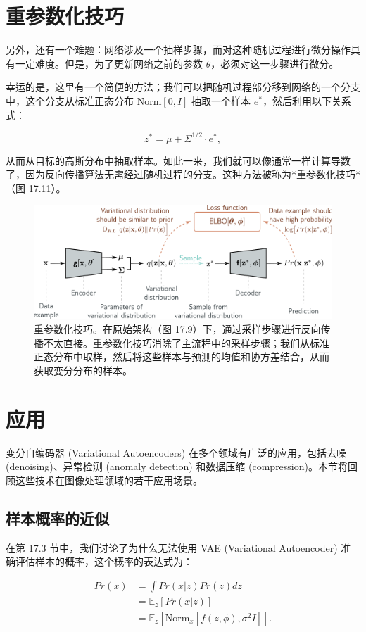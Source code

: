 \section{重参数化技巧}
另外，还有一个难题：网络涉及一个抽样步骤，而对这种随机过程进行微分操作具有一定难度。但是，为了更新网络之前的参数 \(\theta\)，必须对这一步骤进行微分。

幸运的是，这里有一个简便的方法；我们可以把随机过程部分移到网络的一个分支中，这个分支从标准正态分布 \(\text{Norm}[0, I]\) 抽取一个样本 \(e^*\)，然后利用以下关系式：

\begin{equation}
z^* = \mu + \Sigma^{1/2} \cdot e^*, 
\end{equation}

从而从目标的高斯分布中抽取样本。如此一来，我们就可以像通常一样计算导数了，因为反向传播算法无需经过随机过程的分支。这种方法被称为*重参数化技巧*（图 17.11）。

\begin{figure}[ht!]
\centering
\includegraphics[width=0.7\linewidth]{png/chapter17/VAEArch.png}
\caption{重参数化技巧。在原始架构（图 17.9）下，通过采样步骤进行反向传播不太直接。重参数化技巧消除了主流程中的采样步骤；我们从标准正态分布中取样，然后将这些样本与预测的均值和协方差结合，从而获取变分分布的样本。}
\end{figure}


\section{应用}
变分自编码器 (Variational Autoencoders) 在多个领域有广泛的应用，包括去噪 (denoising)、异常检测 (anomaly detection) 和数据压缩 (compression)。本节将回顾这些技术在图像处理领域的若干应用场景。

\subsection{样本概率的近似}
在第 17.3 节中，我们讨论了为什么无法使用 VAE (Variational Autoencoder) 准确评估样本的概率，这个概率的表达式为：


\begin{align}
Pr(x) &= \int Pr(x|z)Pr(z)dz \\
&= \mathbb{E}_{z} [Pr(x|z)] \\
&= \mathbb{E}_{z} [\text{Norm}_x[f(z, \phi), \sigma^2 I]]. 
\end{align}


